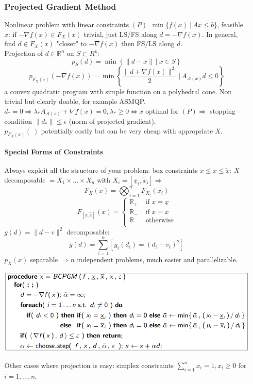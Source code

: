 \documentclass[10pt]{report}
\begin{document}
\subsubsection{Projected Gradient Method} Nonlinear problem with linear constraints $(P)\:\:\min\{f(x)\:|\:Ax\leq b\}$, feasible $x$: if $-\nabla f(x)\in F_X(x)$ trivial, just LS/FS along $d=-\nabla f(x)$. In general, find $d\in F_X(x)$ "closer" to $-\nabla f(x)$ then FS/LS along $d$.\\
Projection of $d\in \mathbb{R}^n$ on $S\subset R^n$: $$p_S(d)=\min\left\{\|d-x\|\:|\:x\in S\right\}$$ $$p_{F_X(x)}(-\nabla f(x))=\min\left\{\frac{\|d+\nabla f(x)\|^2}{2}\:|\:A_{\mathscr{A}(x)}d\leq 0\right\}$$
a convex quadratic program with simple function on a polyhedral cone. Non trivial but clearly doable, for example ASMQP. $d_*=0\Rightarrow \lambda_*A_{\mathscr{A}(x)}+\nabla f(x) = 0, \lambda_* \geq 0\Leftrightarrow x$ optimal for $(P)\Rightarrow$ stopping condition $\|d_*\|\leq \epsilon$ (norm of projected gradient).\\
$p_{F_X(x)}(\:)$ potentially costly but can be very cheap with appropriate $X$.
\paragraph{Special Forms of Constraints} Always exploit all the structure of your problem: box constraints $\underline{x}\leq x\leq \tilde{x}$: $X$ decomposable $= X_1\times \ldots \times X_n$ with $X_i=[\underline{x}_i, \tilde{x}_i] \Rightarrow$ $$F_X(x) = \bigotimes_{i=1}^n F_{X_i}(x_i)$$ $$F_{[\underline{x},\tilde{x}]}(x) = \left\{\begin{array}{cl}
\mathbb{R}_+&\text{ if }x=\underline{x}\\
\mathbb{R}_-&\text{ if }x=\overline{x}\\
\mathbb{R}&\text{ otherwise}\\
\end{array} \right.$$
$g(d) = \|d-v\|^2$ decomposable: $$g(d)=\sum_{i=1}^n [g_i(d_i)=(d_i-v_i)^2]$$
$p_X(x)$ separable $\Rightarrow n$ independent problems, much easier and parallelizable.
\begin{center}
	\includegraphics[scale=0.75]{11.png}
\end{center}
Other cases where projection is easy: simplex constraints $\sum_{i=1}^n x_i = 1, x_i\geq 0$ for $i=1,\ldots,n$.
\end{document}
